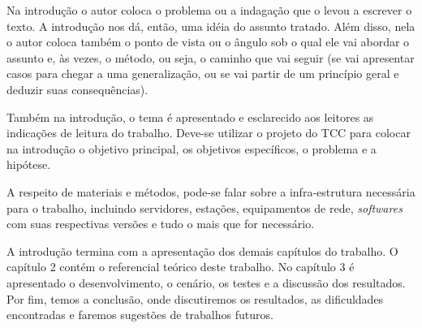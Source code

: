 Na introdução o autor coloca o problema ou a indagação que o levou a escrever o texto. A introdução nos dá, então, uma idéia do assunto tratado. Além disso, nela o autor coloca também o ponto de vista ou o ângulo sob o qual ele vai abordar o assunto e, às vezes, o método, ou seja, o caminho que vai seguir (se vai apresentar casos para chegar a uma generalização, ou se vai partir de um princípio geral e deduzir suas consequências).

Também na introdução, o tema é apresentado e esclarecido aos leitores as indicações de leitura do trabalho. Deve-se utilizar o projeto do TCC para colocar na introdução o objetivo principal, os objetivos específicos, o problema e a hipótese.

A respeito de materiais e métodos, pode-se falar sobre a infra-estrutura necessária para o trabalho, incluindo servidores, estações, equipamentos de rede, \emph{softwares} com suas respectivas versões e tudo o mais que for necessário.

A introdução termina com a apresentação dos demais capítulos do trabalho. O capítulo 2 contém o referencial teórico deste trabalho. No capítulo 3 é apresentado o desenvolvimento, o cenário, os testes e a discussão dos resultados. Por fim, temos a conclusão, onde discutiremos os resultados, as dificuldades encontradas e faremos sugestões de trabalhos futuros.